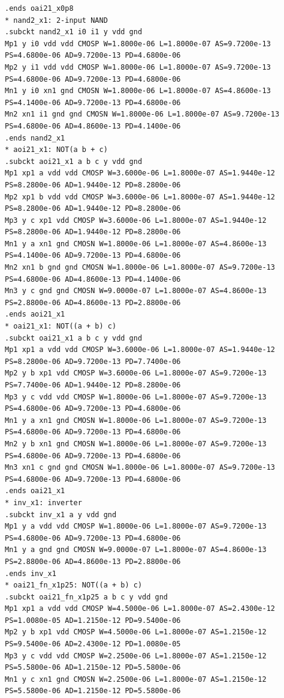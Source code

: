 \documentclass[10pt,a4paper]{article}
\begin{document}
{\begin{verbatim}
.ends oai21_x0p8
* nand2_x1: 2-input NAND
.subckt nand2_x1 i0 i1 y vdd gnd
Mp1 y i0 vdd vdd CMOSP W=1.8000e-06 L=1.8000e-07 AS=9.7200e-13 PS=4.6800e-06 AD=9.7200e-13 PD=4.6800e-06
Mp2 y i1 vdd vdd CMOSP W=1.8000e-06 L=1.8000e-07 AS=9.7200e-13 PS=4.6800e-06 AD=9.7200e-13 PD=4.6800e-06
Mn1 y i0 xn1 gnd CMOSN W=1.8000e-06 L=1.8000e-07 AS=4.8600e-13 PS=4.1400e-06 AD=9.7200e-13 PD=4.6800e-06
Mn2 xn1 i1 gnd gnd CMOSN W=1.8000e-06 L=1.8000e-07 AS=9.7200e-13 PS=4.6800e-06 AD=4.8600e-13 PD=4.1400e-06
.ends nand2_x1
* aoi21_x1: NOT(a b + c)
.subckt aoi21_x1 a b c y vdd gnd
Mp1 xp1 a vdd vdd CMOSP W=3.6000e-06 L=1.8000e-07 AS=1.9440e-12 PS=8.2800e-06 AD=1.9440e-12 PD=8.2800e-06
Mp2 xp1 b vdd vdd CMOSP W=3.6000e-06 L=1.8000e-07 AS=1.9440e-12 PS=8.2800e-06 AD=1.9440e-12 PD=8.2800e-06
Mp3 y c xp1 vdd CMOSP W=3.6000e-06 L=1.8000e-07 AS=1.9440e-12 PS=8.2800e-06 AD=1.9440e-12 PD=8.2800e-06
Mn1 y a xn1 gnd CMOSN W=1.8000e-06 L=1.8000e-07 AS=4.8600e-13 PS=4.1400e-06 AD=9.7200e-13 PD=4.6800e-06
Mn2 xn1 b gnd gnd CMOSN W=1.8000e-06 L=1.8000e-07 AS=9.7200e-13 PS=4.6800e-06 AD=4.8600e-13 PD=4.1400e-06
Mn3 y c gnd gnd CMOSN W=9.0000e-07 L=1.8000e-07 AS=4.8600e-13 PS=2.8800e-06 AD=4.8600e-13 PD=2.8800e-06
.ends aoi21_x1
* oai21_x1: NOT((a + b) c)
.subckt oai21_x1 a b c y vdd gnd
Mp1 xp1 a vdd vdd CMOSP W=3.6000e-06 L=1.8000e-07 AS=1.9440e-12 PS=8.2800e-06 AD=9.7200e-13 PD=7.7400e-06
Mp2 y b xp1 vdd CMOSP W=3.6000e-06 L=1.8000e-07 AS=9.7200e-13 PS=7.7400e-06 AD=1.9440e-12 PD=8.2800e-06
Mp3 y c vdd vdd CMOSP W=1.8000e-06 L=1.8000e-07 AS=9.7200e-13 PS=4.6800e-06 AD=9.7200e-13 PD=4.6800e-06
Mn1 y a xn1 gnd CMOSN W=1.8000e-06 L=1.8000e-07 AS=9.7200e-13 PS=4.6800e-06 AD=9.7200e-13 PD=4.6800e-06
Mn2 y b xn1 gnd CMOSN W=1.8000e-06 L=1.8000e-07 AS=9.7200e-13 PS=4.6800e-06 AD=9.7200e-13 PD=4.6800e-06
Mn3 xn1 c gnd gnd CMOSN W=1.8000e-06 L=1.8000e-07 AS=9.7200e-13 PS=4.6800e-06 AD=9.7200e-13 PD=4.6800e-06
.ends oai21_x1
* inv_x1: inverter
.subckt inv_x1 a y vdd gnd
Mp1 y a vdd vdd CMOSP W=1.8000e-06 L=1.8000e-07 AS=9.7200e-13 PS=4.6800e-06 AD=9.7200e-13 PD=4.6800e-06
Mn1 y a gnd gnd CMOSN W=9.0000e-07 L=1.8000e-07 AS=4.8600e-13 PS=2.8800e-06 AD=4.8600e-13 PD=2.8800e-06
.ends inv_x1
* oai21_fn_x1p25: NOT((a + b) c)
.subckt oai21_fn_x1p25 a b c y vdd gnd
Mp1 xp1 a vdd vdd CMOSP W=4.5000e-06 L=1.8000e-07 AS=2.4300e-12 PS=1.0080e-05 AD=1.2150e-12 PD=9.5400e-06
Mp2 y b xp1 vdd CMOSP W=4.5000e-06 L=1.8000e-07 AS=1.2150e-12 PS=9.5400e-06 AD=2.4300e-12 PD=1.0080e-05
Mp3 y c vdd vdd CMOSP W=2.2500e-06 L=1.8000e-07 AS=1.2150e-12 PS=5.5800e-06 AD=1.2150e-12 PD=5.5800e-06
Mn1 y c xn1 gnd CMOSN W=2.2500e-06 L=1.8000e-07 AS=1.2150e-12 PS=5.5800e-06 AD=1.2150e-12 PD=5.5800e-06

\end{verbatim}}
\end{document}
